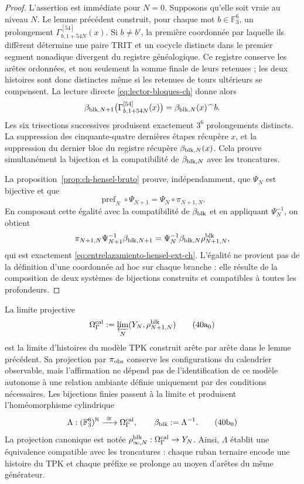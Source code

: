\begin{proof}
L’assertion est immédiate pour \(N=0\). Supposons qu’elle soit vraie au niveau
\(N\). Le lemme précédent construit, pour chaque mot
\(b\in\mathbb F_3^6\), un prolongement
    \(\Gamma_{b,1+54N}^{[54]}(x)\). Si \(b\ne b'\), la première coordonnée par laquelle
ils diffèrent détermine une paire TRIT et un cocycle distincts dans le premier
segment nonadique divergent du registre généalogique. Ce registre conserve
les arêtes ordonnées, et non seulement la somme finale de leurs retenues ; les deux
histoires sont donc distinctes même si les retenues de tours ultérieurs se
compensent. La lecture directe \eqref{eq:lector-bloques-ch} donne alors
\begin{equation}
 \beta_{{\rm blk},N+1}
 \bigl(\Gamma_{b,1+54N}^{[54]}(x)\bigr)
 =\beta_{{\rm blk},N}(x)^\frown b.
 \label{eq:beta-concatenacion-demostrada-ch}
\end{equation}
Les six trisections successives produisent exactement \(3^6\) prolongements distincts. La suppression des cinquante-quatre dernières étapes récupère \(x\), et la suppression du dernier bloc du registre récupère \(\beta_{{\rm blk},N}(x)\). Cela prouve simultanément la bijection et la compatibilité de \(\beta_{{\rm blk},N}\) avec les troncatures.

La proposition~\ref{prop:ch-hensel-bruto} prouve, indépendamment, que
\(\Psi_N\) est bijective et que
\[
 \operatorname{pref}_N\circ\Psi_{N+1}
 =\Psi_N\circ\pi_{N+1,N}.
\]
En composant cette égalité avec la compatibilité de \(\beta_{\rm blk}\) et en
appliquant \(\Psi_N^{-1}\), on obtient
\[
 \pi_{N+1,N}\Psi_{N+1}^{-1}\beta_{{\rm blk},N+1}
 =\Psi_N^{-1}\beta_{{\rm blk},N}\rho^{\rm blk}_{N+1,N},
\]
qui est exactement \eqref{eq:entrelazamiento-hensel-ext-ch}. L’égalité ne
provient pas de la définition d’une coordonnée ad hoc sur chaque branche : elle résulte de la composition
de deux systèmes de bijections construits et compatibles à toutes les
profondeurs.
\end{proof}

La limite projective
\[
 \Omega_\Gamma^{\rm cal}:=
 \varprojlim_N(Y_N,\rho^{\rm blk}_{N+1,N})
\tag{40a$_0$}
\label{eq:omega-gamma-catalogal-ch}
\]
est la limite d'histoires du modèle TPK construit arête par arête dans le lemme précédent. Sa projection par \(\pi_{\rm obs}\) conserve les configurations du calendrier observable, mais l'affirmation ne dépend pas de l'identification de ce modèle autonome à une relation ambiante définie uniquement par des conditions nécessaires. Les bijections finies passent à la limite et produisent l'homéomorphisme cylindrique
\[
 \Lambda:(\mathbb F_3^6)^{\mathbb N}
 \xrightarrow{\ \cong\ }\Omega_\Gamma^{\rm cal},
 \qquad
 \beta_{\rm blk}:=\Lambda^{-1}.
\tag{40b$_0$}
\label{eq:homeomorfismo-calibrado-ch}
\]
La projection canonique est notée
\(\rho^{\rm blk}_{\infty,N}:\Omega_\Gamma^{\rm cal}\to Y_N\).
Ainsi, \(\Lambda\) établit une équivalence compatible avec les
troncatures : chaque ruban ternaire encode une histoire du TPK et chaque
préfixe se prolonge au moyen d’arêtes du même générateur.

